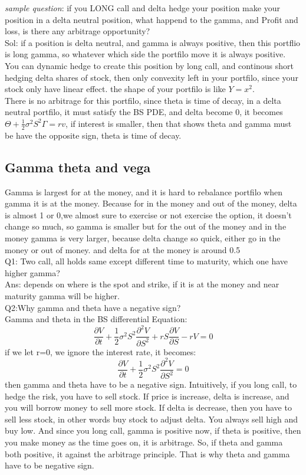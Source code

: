 \documentclass[a4paper,11pt]{article}
\begin{document}
{\em sample question}: if you LONG call and delta hedge your position make your position in a delta neutral position, what happend to the gamma, and Profit and loss, is there any arbitrage opportunity?\\
Sol: if a position is delta neutral, and gamma is always positive, then this portflio is long gamma, so whatever which side the portfilo move it is always positive. You can dynamic hedge to create this position by long call, and continous short hedging delta shares of stock, then only convexity left in your portfilo, since your stock only have linear effect. the shape of your portfilo is like $Y=x^2$.\\
There is no arbitrage for this portfilo, since theta is time of decay, in a delta neutral portfilo, it must satisfy the BS PDE, and delta become 0, it becomes $\Theta+\frac{1}{2}\sigma^2S^2\Gamma=rv$, if interest is smaller, then that shows theta and gamma must be have the opposite sign, theta is time of decay.
\subsection{Gamma theta and vega}
Gamma is largest for at the money, and it is hard to rebalance portfilo when gamma it is at the money. Because for in the money and out of the money, delta is almost 1 or 0,we almost sure to exercise or not exercise the option, it doesn't change so much, so gamma is smaller but for the out of the money and in the money gamma is very larger, because delta change so quick, either go in the money or out of money. and delta for at the money is around 0.5\\
Q1: Two call, all holds same except different time to maturity, which one have higher gamma?\\
Ans: depends on where is the spot and strike, if it is at the money and near maturity gamma will be higher.\\
Q2:Why gamma and theta have a negative sign?\\
Gamma and theta in the BS differential Equation:\\
$$
\frac{\partial V}{\partial t} + \frac{1}{2}\sigma^2 S^2 \frac{\partial^2 V}{\partial S^2} + rS\frac{\partial V}{\partial S} - rV = 0
$$
if we let r=0, we ignore the interest rate, it becomes:\\
$$
\frac{\partial V}{\partial t} + \frac{1}{2}\sigma^2 S^2 \frac{\partial^2 V}{\partial S^2}  = 0
$$
then gamma and theta have to be a negative sign. Intuitively, if you long call, to hedge the risk, you have to sell stock. If price is increase, delta is increase, and you will borrow money to sell more stock. If delta is decrease, then you have to sell less stock, in other words buy stock to adjust delta. You always sell high and buy low. And since you long call, gamma is positive now, if theta is positive, then you make money as the time goes on, it is arbitrage. So, if theta and gamma both positive, it against the arbitrage principle. That is why theta and gamma have to be negative sign.\\
\end{document}
